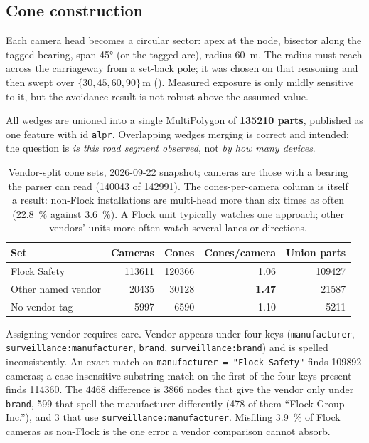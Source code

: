 \documentclass[11pt,twoside]{article}
\begin{document}
\subsection{Cone construction}
\label{sec:data:cones}

Each camera head becomes a circular sector: apex at the node, bisector along the tagged
bearing, span \ang{45} (or the tagged arc), radius \SI{60}{\metre}. The radius must reach
across the carriageway from a set-back pole; it was chosen on that reasoning and then swept
over $\{30,45,60,90\}\,\si{\metre}$ (). Measured exposure is only mildly
sensitive to it, but the avoidance result is not robust above the assumed value.

All wedges are unioned into a single MultiPolygon of \textbf{\num{135210} parts},
published as one feature with id \texttt{alpr}. Overlapping wedges merging is correct and
intended: the question is \emph{is this road segment observed}, not \emph{by how many
devices}.

\begin{table}[tbp]
\centering
\small
\caption{Vendor-split cone sets, 2026-09-22 snapshot; cameras are those with a bearing the
parser can read (\num{140043} of \num{142991}). The cones-per-camera column is itself a result:
non-Flock installations are multi-head more than six times as often (\SI{22.8}{\percent}
against \SI{3.6}{\percent}). A Flock unit typically watches one approach; other vendors' units
more often watch several lanes or directions.}
\label{tab:vendorsets}
\begin{tabular}{lrrrr}
\toprule
Set & Cameras & Cones & Cones/camera & Union parts \\
\midrule
Flock Safety       & \num{113611} & \num{120366} & 1.06 & \num{109427} \\
Other named vendor & \num{20435}  & \num{30128}  & \textbf{1.47} & \num{21587} \\
No vendor tag      & \num{5997}   & \num{6590}   & 1.10 & \num{5211} \\
\bottomrule
\end{tabular}
\end{table}

Assigning vendor requires care. Vendor appears under four keys
(\texttt{manufacturer}, \texttt{surveillance:\allowbreak manufacturer}, \texttt{brand},
\texttt{surveillance:\allowbreak brand}) and is spelled inconsistently. An exact match on
\texttt{manufacturer = "Flock Safety"} finds \num{109892} cameras; a case-insensitive
substring match on the first of the four keys present finds \num{114360}. The \num{4468}
difference is \num{3866} nodes that give the vendor only under \texttt{brand}, 599 that spell
the manufacturer differently (478 of them ``Flock Group Inc.''), and 3 that use
\texttt{surveillance:\allowbreak manufacturer}. Misfiling \SI{3.9}{\percent} of Flock cameras
as non-Flock is the one error a vendor comparison cannot absorb.
\end{document}
